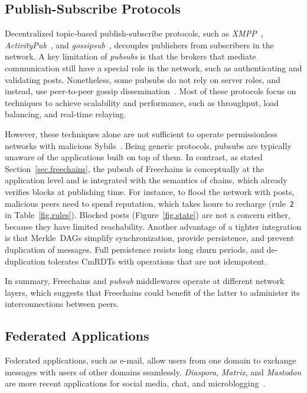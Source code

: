 \documentclass[10pt,journal,compsoc]{IEEEtran}
\newcommand{\FC}       {Freechains\xspace}
\newcommand{\code}[1]  {\texttt{\footnotesize{#1}}}
\begin{document}
\subsection{Publish-Subscribe Protocols}

Decentralized topic-based publish-subscribe protocols, such as
    \emph{XMPP}~\cite{pubsub.xmpp},
    \emph{ActivityPub}~\cite{pubsub.activitypub}, and
    \emph{gossipsub}~\cite{pubsub.gossipsub},
decouples publishers from subscribers in the network.
%
A key limitation of \emph{pubsubs} is that the brokers that mediate
communication still have a special role in the network, such as authenticating
and validating posts.
%
Nonetheless, some pubsubs do not rely on server roles, and instead, use
peer-to-peer gossip dissemination~\cite{pubsub.tera,pubsub.rappel,pubsub.stan,pubsub.vitis,pubsub.gossipsub,pubsub.rappel}.
Most of these protocols focus on techniques to achieve scalability and
performance, such as throughput, load balancing, and real-time relaying.

However, these techniques alone are not sufficient to operate permissionless
networks with malicious Sybils~\cite{pubsub.gossipsub2}.
Being generic protocols, pubsubs are typically unaware of the applications
built on top of them.
%
In contrast, as stated Section~\ref{sec.freechains}, the pubsub of \FC is
conceptually at the application level and is integrated with the semantics of
chains, which already verifies blocks at publishing time.
For instance, to flood the network with posts, malicious peers need to spend
reputation, which takes hours to recharge (rule~\code{2} in
Table~\ref{fig.rules}).
Blocked posts (Figure~\ref{fig.state}) are not a concern either, because they
have limited reachability.
Another advantage of a tighter integration is that Merkle~DAGs simplify
synchronization, provide persistence, and prevent duplication of messages.
Full persistence resists long churn periods, and de-duplication tolerates
CmRDTs with operations that are not idempotent.

In summary, \FC and \emph{pubsub} middlewares operate at different network
layers, which suggests that \FC could benefit of the latter to administer its
interconnections between peers.

\subsection{Federated Applications}

Federated applications, such as e-mail, allow users from one domain to exchange
messages with users of other domains seamlessly.
\emph{Diaspora}, \emph{Matrix}, and \emph{Mastodon} are more recent
applications for social media, chat, and microblogging~\cite{p2p.ecosystem}.
\end{document}
